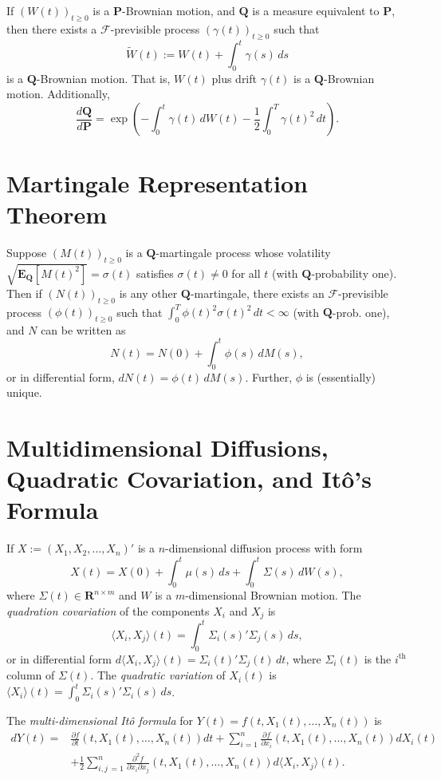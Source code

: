 \documentclass[twocolumn]{amsart}
\renewcommand{\P}{\mathbf{P}}
\newcommand{\Q}{\mathbf{Q}}
\newcommand{\EQ}{\mathbf{E}_\mathbf{Q}}
\newcommand{\F}{\mathcal{F}}
\newcommand{\R}{\mathbf{R}}
\newcommand{\QV}[1]{\langle#1\rangle}
\newcommand{\tW}{\widetilde W}
\begin{document}
If $(W(t))_{t \ge 0}$ is a $\P$-Brownian motion, and $\Q$ is a measure equivalent to $\P$, then there exists a $\F$-previsible process $(\gamma(t))_{t \ge 0}$ such that
\[ \tW(t) := W(t) + \int_0^t \gamma(s)\,ds \]
is a $\Q$-Brownian motion. That is, $W(t)$ plus drift $\gamma(t)$ is a $\Q$-Brownian motion. Additionally,
\[ \frac{d \Q}{d \P} = \exp\left(-\int_0^t \gamma(t)\,dW(t) - \frac{1}{2} \int_0^T \gamma(t)^2\,dt\right).\]

\section*{Martingale Representation Theorem}

Suppose $(M(t))_{t \ge 0}$ is a $\Q$-martingale process whose volatility $\sqrt{\EQ[M(t)^2]} = \sigma(t)$ satisfies $\sigma(t) \ne 0$ for all $t$ (with $\Q$-probability one). Then if $(N(t))_{t \ge 0}$ is any other $\Q$-martingale, there exists an $\F$-previsible process $(\phi(t))_{t \ge 0}$ such that $\int_0^T \phi(t)^2 \sigma(t)^2\,dt < \infty$ (with $\Q$-prob. one), and $N$ can be written as
\[ N(t) = N(0) + \int_0^t \phi(s)\,dM(s), \]
or in differential form, $dN(t) = \phi(t)\,dM(s)$. Further, $\phi$ is (essentially) unique.

\section*{Multidimensional Diffusions, Quadratic Covariation, and It\^o's Formula}

If $X := (X_1, X_2, \ldots, X_n)'$ is a $n$-dimensional diffusion process with form
\begin{equation*}
    X(t) = X(0) + \int_0^t \mu(s)\,ds + \int_0^t \Sigma(s)\,dW(s),
\end{equation*}
where $\Sigma(t) \in \R^{n \times m}$ and $W$ is a $m$-dimensional Brownian motion. The \emph{quadration covariation} of the components $X_i$ and $X_j$ is
\begin{equation*}
    \QV{X_i,X_j}(t) = \int_0^t \Sigma_i(s)' \Sigma_j(s)\,ds,
\end{equation*}
or in differential form $d\QV{X_i,X_j}(t) = \Sigma_i(t)'\Sigma_j(t)\,dt$, where $\Sigma_i(t)$ is the $i^\text{th}$ column of $\Sigma(t)$. The \emph{quadratic variation} of $X_i(t)$ is $\QV{X_i}(t) = \int_0^t \Sigma_i(s)' \Sigma_i(s)\,ds$.

The \emph{multi-dimensional It\^{o} formula} for $Y(t) = f(t, X_1(t), \ldots, X_n(t))$
is
\begin{align*}
    d Y(t) = &\frac{\partial f}{\partial t} (t,X_1(t), \ldots, X_n(t)) dt
            + \sum_{i=1}^n \frac{\partial f}{\partial x_i} (t,X_1(t), \ldots, X_n(t))dX_i(t) \\
            &+ \frac{1}{2}\sum_{i,j\,=1}^n \frac{\partial^2 f}{\partial x_i \partial x_j} (t,X_1(t), \ldots, X_n(t)) d \QV{X_i, X_j}(t).
\end{align*}
\end{document}
